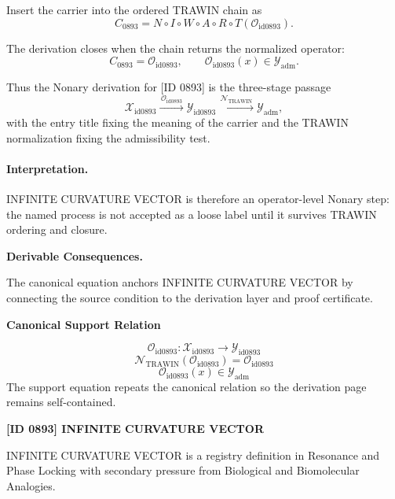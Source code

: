 Insert the carrier into the ordered TRAWIN chain as\[
C_{0893}=N\circ I\circ W\circ A\circ R\circ T(\mathcal{O}_{\mathrm{id0893}}).
\]

The derivation closes when the chain returns the normalized operator:\[
C_{0893}=\mathcal{O}_{\mathrm{id0893}},\qquad \mathcal{O}_{\mathrm{id0893}}(x)\in\mathcal{Y}_{\mathrm{adm}}.
\]

Thus the Nonary derivation for [ID 0893] is the three-stage passage
\[
\mathcal{X}_{\mathrm{id0893}}\xrightarrow{\,\mathcal{O}_{\mathrm{id0893}}\,} \mathcal{Y}_{\mathrm{id0893}}\xrightarrow{\,\mathcal{N}_{\mathrm{TRAWIN}}\,} \mathcal{Y}_{\mathrm{adm}},
\]
with the entry title fixing the meaning of the carrier and the TRAWIN normalization fixing the admissibility test.

\paragraph{Interpretation.} INFINITE CURVATURE VECTOR is therefore an operator-level Nonary step: the named process is not accepted as a loose label until it survives TRAWIN ordering and closure.

\par\vspace{0.35em}
\noindent\textbf{Derivable Consequences.}\quad
\begingroup
\footnotesize
\raggedright
The canonical equation anchors INFINITE CURVATURE VECTOR by connecting the source condition to the derivation layer and proof certificate.
\par\endgroup

\noindent\textbf{Canonical Support Relation}\par
\[
\mathcal{O}_{\mathrm{id0893}}:\mathcal{X}_{\mathrm{id0893}}\longrightarrow\mathcal{Y}_{\mathrm{id0893}}
\]
\[
\mathcal{N}_{\mathrm{TRAWIN}}(\mathcal{O}_{\mathrm{id0893}})=\mathcal{O}_{\mathrm{id0893}}
\]
\[
\mathcal{O}_{\mathrm{id0893}}(x)\in\mathcal{Y}_{\mathrm{adm}}
\]
\noindent The support equation repeats the canonical relation so the derivation page remains self-contained.\par

\clearpage
\noindent\textbf{[ID 0893] INFINITE CURVATURE VECTOR}\par
\vspace{0.35em}
\begingroup\small
{}
INFINITE CURVATURE VECTOR is a registry definition in Resonance and Phase Locking with secondary pressure from Biological and Biomolecular Analogies.

